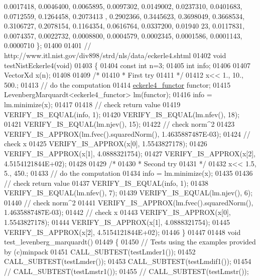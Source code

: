 \begin{DoxyCode}
      0.0017418, 0.0046400, 0.0065895, 0.0097302, 0.0149002, 0.0237310, 0.0401683, 0.0712559, 0.1264458, 0.2073413
      , 0.2902366, 0.3445623, 0.3698049, 0.3668534, 0.3106727, 0.2078154, 0.1164354, 0.0616764, 0.0337200, 0.01940
      23, 0.0117831, 0.0074357, 0.0022732, 0.0008800, 0.0004579, 0.0002345, 0.0001586, 0.0001143, 0.0000710 \};
01400 
01401 \textcolor{comment}{// http://www.itl.nist.gov/div898/strd/nls/data/eckerle4.shtml}
01402 \textcolor{keywordtype}{void} testNistEckerle4(\textcolor{keywordtype}{void})
01403 \{
01404   \textcolor{keyword}{const} \textcolor{keywordtype}{int} n=3;
01405   \textcolor{keywordtype}{int} info;
01406 
01407   VectorXd x(n);
01408 
01409   \textcolor{comment}{/*}
01410 \textcolor{comment}{   * First try}
01411 \textcolor{comment}{   */}
01412   x<< 1., 10., 500.;
01413   \textcolor{comment}{// do the computation}
01414   \hyperlink{structeckerle4__functor}{eckerle4\_functor} functor;
01415   LevenbergMarquardt<eckerle4\_functor> lm(functor);
01416   info = lm.minimize(x);
01417 
01418   \textcolor{comment}{// check return value}
01419   VERIFY\_IS\_EQUAL(info, 1);
01420   VERIFY\_IS\_EQUAL(lm.nfev(), 18);
01421   VERIFY\_IS\_EQUAL(lm.njev(), 15);
01422   \textcolor{comment}{// check norm^2}
01423   VERIFY\_IS\_APPROX(lm.fvec().squaredNorm(), 1.4635887487E-03);
01424   \textcolor{comment}{// check x}
01425   VERIFY\_IS\_APPROX(x[0], 1.5543827178);
01426   VERIFY\_IS\_APPROX(x[1], 4.0888321754);
01427   VERIFY\_IS\_APPROX(x[2], 4.5154121844E+02);
01428 
01429   \textcolor{comment}{/*}
01430 \textcolor{comment}{   * Second try}
01431 \textcolor{comment}{   */}
01432   x<< 1.5, 5., 450.;
01433   \textcolor{comment}{// do the computation}
01434   info = lm.minimize(x);
01435 
01436   \textcolor{comment}{// check return value}
01437   VERIFY\_IS\_EQUAL(info, 1);
01438   VERIFY\_IS\_EQUAL(lm.nfev(), 7);
01439   VERIFY\_IS\_EQUAL(lm.njev(), 6);
01440   \textcolor{comment}{// check norm^2}
01441   VERIFY\_IS\_APPROX(lm.fvec().squaredNorm(), 1.4635887487E-03);
01442   \textcolor{comment}{// check x}
01443   VERIFY\_IS\_APPROX(x[0], 1.5543827178);
01444   VERIFY\_IS\_APPROX(x[1], 4.0888321754);
01445   VERIFY\_IS\_APPROX(x[2], 4.5154121844E+02);
01446 \}
01447 
01448 \textcolor{keywordtype}{void} test\_levenberg\_marquardt()
01449 \{
01450     \textcolor{comment}{// Tests using the examples provided by (c)minpack}
01451     CALL\_SUBTEST(testLmder1());
01452     CALL\_SUBTEST(testLmder());
01453     CALL\_SUBTEST(testLmdif1());
01454 \textcolor{comment}{//     CALL\_SUBTEST(testLmstr1());}
01455 \textcolor{comment}{//     CALL\_SUBTEST(testLmstr());}

\end{DoxyCode}
